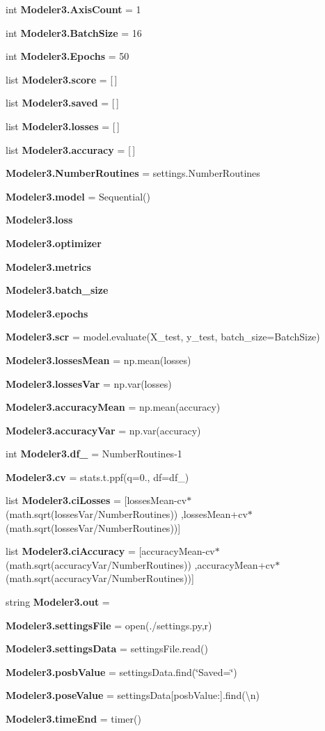 \begin{DoxyCompactItemize}
int \textbf{ Modeler3.\+Axis\+Count} = 1
\item 
int \textbf{ Modeler3.\+Batch\+Size} = 16
\item 
int \textbf{ Modeler3.\+Epochs} = 50
\item 
list \textbf{ Modeler3.\+score} = [$\,$]
\item 
list \textbf{ Modeler3.\+saved} = [$\,$]
\item 
list \textbf{ Modeler3.\+losses} = [$\,$]
\item 
list \textbf{ Modeler3.\+accuracy} = [$\,$]
\item 
\textbf{ Modeler3.\+Number\+Routines} = settings.\+Number\+Routines
\item 
\textbf{ Modeler3.\+model} = Sequential()
\item 
\textbf{ Modeler3.\+loss}
\item 
\textbf{ Modeler3.\+optimizer}
\item 
\textbf{ Modeler3.\+metrics}
\item 
\textbf{ Modeler3.\+batch\+\_\+size}
\item 
\textbf{ Modeler3.\+epochs}
\item 
\textbf{ Modeler3.\+scr} = model.\+evaluate(X\+\_\+test, y\+\_\+test, batch\+\_\+size=Batch\+Size)
\item 
\textbf{ Modeler3.\+losses\+Mean} = np.\+mean(losses)
\item 
\textbf{ Modeler3.\+losses\+Var} = np.\+var(losses)
\item 
\textbf{ Modeler3.\+accuracy\+Mean} = np.\+mean(accuracy)
\item 
\textbf{ Modeler3.\+accuracy\+Var} = np.\+var(accuracy)
\item 
int \textbf{ Modeler3.\+df\+\_\+} = Number\+Routines-\/1
\item 
\textbf{ Modeler3.\+cv} = stats.\+t.\+ppf(q=0., df=df\+\_\+)
\item 
list \textbf{ Modeler3.\+ci\+Losses} = [losses\+Mean-\/cv$\ast$(math.\+sqrt(losses\+Var/Number\+Routines)) ,losses\+Mean+cv$\ast$(math.\+sqrt(losses\+Var/Number\+Routines))]
\item 
list \textbf{ Modeler3.\+ci\+Accuracy} = [accuracy\+Mean-\/cv$\ast$(math.\+sqrt(accuracy\+Var/Number\+Routines)) ,accuracy\+Mean+cv$\ast$(math.\+sqrt(accuracy\+Var/Number\+Routines))]
\item 
string \textbf{ Modeler3.\+out} = \textquotesingle{}\textquotesingle{}
\item 
\textbf{ Modeler3.\+settings\+File} = open(\textquotesingle{}./settings.\+py\textquotesingle{},\textquotesingle{}r\textquotesingle{})
\item 
\textbf{ Modeler3.\+settings\+Data} = settings\+File.\+read()
\item 
\textbf{ Modeler3.\+posb\+Value} = settings\+Data.\+find(\char`\"{}Saved=\char`\"{})
\item 
\textbf{ Modeler3.\+pose\+Value} = settings\+Data[posb\+Value\+:].find(\textquotesingle{}\textbackslash{}n\textquotesingle{})
\item 
\textbf{ Modeler3.\+time\+End} = timer()
\end{DoxyCompactItemize}
